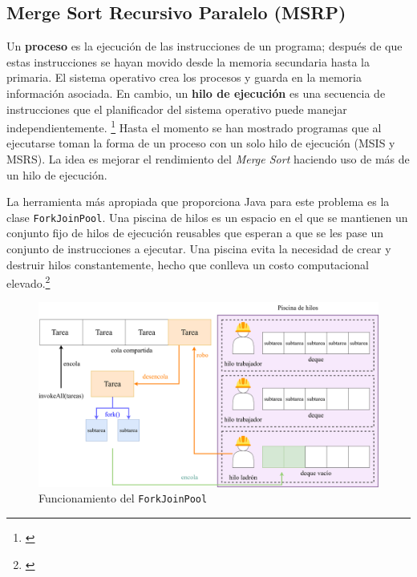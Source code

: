 \documentclass[titlepage]{article}
\begin{document}
\newpage
\subsection{Merge Sort Recursivo Paralelo (MSRP)}%
Un \textbf{proceso} es la ejecución de las instrucciones de un programa; después de que estas instrucciones se hayan movido desde la memoria secundaria hasta la primaria. El sistema operativo crea los procesos y guarda en la memoria información asociada. En cambio, un \textbf{hilo de ejecución} es una secuencia de instrucciones que el planificador del sistema operativo puede manejar independientemente. \footnote{\cite{bobrov-2023}} Hasta el momento se han mostrado programas que al ejecutarse toman la forma de un proceso con un solo hilo de ejecución (MSIS y MSRS). La idea es mejorar el rendimiento del \textit{Merge Sort} haciendo uso de más de un hilo de ejecución. 

La herramienta más apropiada que proporciona Java para este problema es la clase \lstinline|ForkJoinPool|.\footnotemark {} Una piscina de hilos es un espacio en el que se mantienen un conjunto fijo de hilos de ejecución reusables que esperan a que se les pase un conjunto de instrucciones a ejecutar. Una piscina evita la necesidad de crear y destruir hilos constantemente, hecho que conlleva un costo computacional elevado.\footnote{\cite{engle_2022}}

\begin{figure}[h]
	\centering
	\includegraphics[width=0.75\linewidth]{Diagrames/forkJoinPool.png}
	\caption{Funcionamiento del \lstinline{ForkJoinPool}}
	\label{fig:forkJoinPool}
\end{figure}
\end{document}
